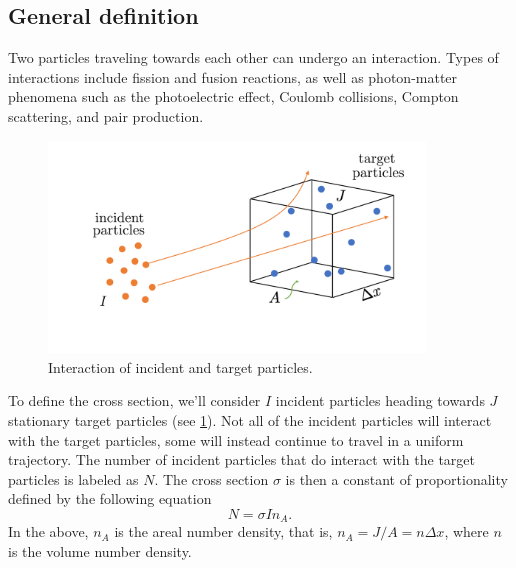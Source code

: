 \documentclass[a4paper,11pt]{report}
\begin{document}
\subsection{General definition}
Two particles traveling towards each other can undergo an interaction. Types of interactions include fission and fusion reactions, as well as photon-matter phenomena such as the photoelectric effect, Coulomb collisions, Compton scattering, and pair production.

\begin{figure}[ht]
    \centering
    \includegraphics[width=10cm]{../../images/cross_section.pdf}
    \caption{Interaction of incident and target particles.}
    \label{fig:cross_many_particles}
\end{figure}
To define the cross section, we'll consider $I$ incident particles heading towards $J$ stationary target particles (see \cref{fig:cross_many_particles}). Not all of the incident particles will interact with the target particles, some will instead continue to travel in a uniform trajectory. The number of incident particles that do interact with the target particles is labeled as $N$. The cross section $\sigma$ is then a constant of proportionality defined by the following equation
\begin{equation}
    \label{eq:cross_def}
    N = \sigma I n_A.
\end{equation}
In the above, $n_A$ is the areal number density, that is, $n_A = J / A = n \Delta x$, where $n$ is the volume number density.

\end{document}
